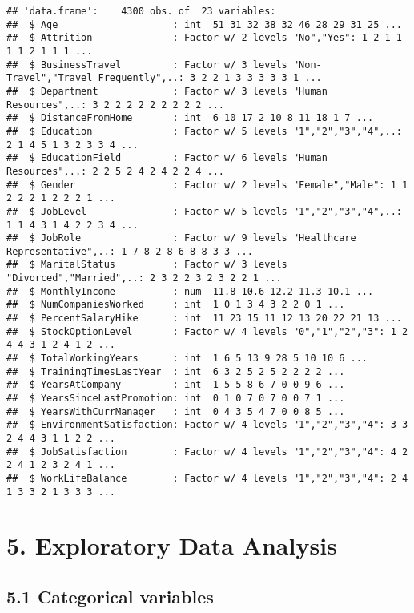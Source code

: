 \documentclass[
]{article}
\begin{document}
\begin{verbatim}
## 'data.frame':    4300 obs. of  23 variables:
##  $ Age                    : int  51 31 32 38 32 46 28 29 31 25 ...
##  $ Attrition              : Factor w/ 2 levels "No","Yes": 1 2 1 1 1 1 2 1 1 1 ...
##  $ BusinessTravel         : Factor w/ 3 levels "Non-Travel","Travel_Frequently",..: 3 2 2 1 3 3 3 3 3 1 ...
##  $ Department             : Factor w/ 3 levels "Human Resources",..: 3 2 2 2 2 2 2 2 2 2 ...
##  $ DistanceFromHome       : int  6 10 17 2 10 8 11 18 1 7 ...
##  $ Education              : Factor w/ 5 levels "1","2","3","4",..: 2 1 4 5 1 3 2 3 3 4 ...
##  $ EducationField         : Factor w/ 6 levels "Human Resources",..: 2 2 5 2 4 2 4 2 2 4 ...
##  $ Gender                 : Factor w/ 2 levels "Female","Male": 1 1 2 2 2 1 2 2 2 1 ...
##  $ JobLevel               : Factor w/ 5 levels "1","2","3","4",..: 1 1 4 3 1 4 2 2 3 4 ...
##  $ JobRole                : Factor w/ 9 levels "Healthcare Representative",..: 1 7 8 2 8 6 8 8 3 3 ...
##  $ MaritalStatus          : Factor w/ 3 levels "Divorced","Married",..: 2 3 2 2 3 2 3 2 2 1 ...
##  $ MonthlyIncome          : num  11.8 10.6 12.2 11.3 10.1 ...
##  $ NumCompaniesWorked     : int  1 0 1 3 4 3 2 2 0 1 ...
##  $ PercentSalaryHike      : int  11 23 15 11 12 13 20 22 21 13 ...
##  $ StockOptionLevel       : Factor w/ 4 levels "0","1","2","3": 1 2 4 4 3 1 2 4 1 2 ...
##  $ TotalWorkingYears      : int  1 6 5 13 9 28 5 10 10 6 ...
##  $ TrainingTimesLastYear  : int  6 3 2 5 2 5 2 2 2 2 ...
##  $ YearsAtCompany         : int  1 5 5 8 6 7 0 0 9 6 ...
##  $ YearsSinceLastPromotion: int  0 1 0 7 0 7 0 0 7 1 ...
##  $ YearsWithCurrManager   : int  0 4 3 5 4 7 0 0 8 5 ...
##  $ EnvironmentSatisfaction: Factor w/ 4 levels "1","2","3","4": 3 3 2 4 4 3 1 1 2 2 ...
##  $ JobSatisfaction        : Factor w/ 4 levels "1","2","3","4": 4 2 2 4 1 2 3 2 4 1 ...
##  $ WorkLifeBalance        : Factor w/ 4 levels "1","2","3","4": 2 4 1 3 3 2 1 3 3 3 ...
\end{verbatim}

\hypertarget{exploratory-data-analysis}{%
\section{5. Exploratory Data Analysis}\label{exploratory-data-analysis}}

\hypertarget{categorical-variables}{%
\subsection{5.1 Categorical variables}\label{categorical-variables}}
\end{document}
